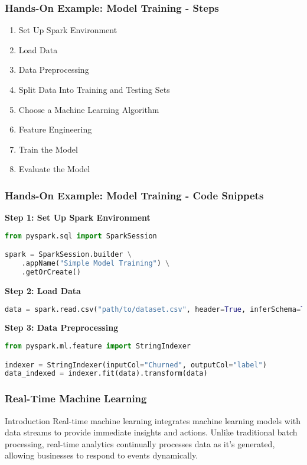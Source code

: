 \documentclass[aspectratio=169]{beamer}
\begin{document}
\begin{frame}[fragile]
    \frametitle{Hands-On Example: Model Training - Steps}
    \begin{enumerate}
        \item Set Up Spark Environment
        \item Load Data
        \item Data Preprocessing
        \item Split Data Into Training and Testing Sets
        \item Choose a Machine Learning Algorithm
        \item Feature Engineering
        \item Train the Model
        \item Evaluate the Model
    \end{enumerate}
\end{frame}

\begin{frame}[fragile]
    \frametitle{Hands-On Example: Model Training - Code Snippets}
    \textbf{Step 1: Set Up Spark Environment}
    \begin{lstlisting}[language=Python]
from pyspark.sql import SparkSession

spark = SparkSession.builder \
    .appName("Simple Model Training") \
    .getOrCreate()
    \end{lstlisting}

    \textbf{Step 2: Load Data}
    \begin{lstlisting}[language=Python]
data = spark.read.csv("path/to/dataset.csv", header=True, inferSchema=True)
    \end{lstlisting}

    \textbf{Step 3: Data Preprocessing}
    \begin{lstlisting}[language=Python]
from pyspark.ml.feature import StringIndexer

indexer = StringIndexer(inputCol="Churned", outputCol="label")
data_indexed = indexer.fit(data).transform(data)
    \end{lstlisting}
\end{frame}

\begin{frame}[fragile]
    \frametitle{Real-Time Machine Learning}
    \begin{block}{Introduction}
        Real-time machine learning integrates machine learning models with data streams to provide immediate insights and actions. 
        Unlike traditional batch processing, real-time analytics continually processes data as it's generated, allowing businesses to respond to events dynamically.
    \end{block}
\end{frame}
\end{document}
